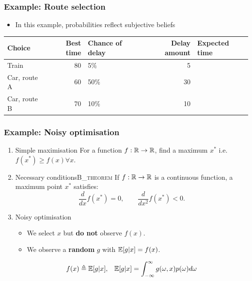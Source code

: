 \documentclass[smaller]{article}
\begin{document}
\subsubsection{Example: Route selection}
\label{sec:org537c986}
\begin{itemize}
\item In this example, probabilities reflect subjective beliefs
\end{itemize}

\begin{center}
\begin{tabular}{lrlrl}
\hline
Choice & Best time & Chance of delay & Delay amount & Expected time\\
\hline
Train & 80 & 5\% & 5 & \\
Car, route A & 60 & 50\% & 30 & \\
Car, route B & 70 & 10\% & 10 & \\
\hline
\end{tabular}
\end{center}


\subsubsection{Example: Noisy optimisation}
\label{sec:org649b583}
\begin{enumerate}
\item Simple maximisation
\label{sec:orgda61b39}
For a function \(f : \mathbb{R} \to \mathbb{R}\), find a maximum \(x^*\) i.e. \(f(x^*) \geq f(x) \forall x\).
\item Necessary conditions\hfill{}\textsc{B\_theorem}
\label{sec:org28e088d}
If \(f: \mathbb{R} \to \mathbb{R}\) is a continuous function, a maximum point \(x^*\) satisfies:
\[
\frac{d}{dx} f(x^*) = 0,
\qquad
\frac{d}{dx^2} f(x^*) < 0.
\]
\item Noisy optimisation
\label{sec:orge1a7d83}
\begin{itemize}
\item We select \(x\) but \textbf{do not} observe \(f(x)\).
\item We observe a \textbf{random} \(g\) with \(\mathop{\mbox{\ensuremath{\mathbb{E}}}}\nolimits[g | x] = f(x)\).
\end{itemize}
\begin{align}
f(x) &\mathrel{\triangleq} \mathop{\mbox{\ensuremath{\mathbb{E}}}}\nolimits[g | x],
&
\mathop{\mbox{\ensuremath{\mathbb{E}}}}\nolimits[g | x] = \int_{- \infty}^\infty g(\omega, x) p(\omega) d\omega
\end{align}
\end{enumerate}
\end{document}
